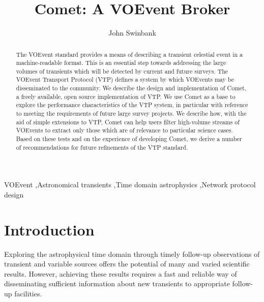 \documentclass[5p,authoryear]{elsarticle}
\begin{document}
\begin{frontmatter}

\title{Comet: A VOEvent Broker}

\author{John Swinbank}

\address{Astronomical Institute ``Anton Pannekoek'', University of Amsterdam, Postbus 94249, 1090 GE Amsterdam, The Netherlands}

\begin{abstract}

The VOEvent standard provides a means of describing a transient celestial
event in a machine-readable format. This is an essential step towards
addressing the large volumes of transients which will be detected by current
and future surveys. The VOEvent Transport Protocol (VTP) defines a system by
which VOEvents may be disseminated to the community. We describe the design
and implementation of Comet, a freely available, open source implementation of
VTP. We use Comet as a base to explore the performance characteristics of the
VTP system, in particular with reference to meeting the requirements of future
large survey projects. We describe how, with the aid of simple extensions to
VTP, Comet can help users filter high-volume streams of VOEvents to extract
only those which are of relevance to particular science cases.  Based on these
tests and on the experience of developing Comet, we derive a number of
recommendations for future refinements of the VTP standard.

\end{abstract}

\begin{keyword}
VOEvent \sep Astronomical transients \sep Time domain astrophysics \sep Network protocol design
\end{keyword}

\end{frontmatter}

\section{Introduction}
\label{sec:intro}

Exploring the astrophysical time domain through timely follow-up observations
of transient and variable sources offers the potential of many and varied
scientific results. However, achieving these results requires a fast and
reliable way of disseminating sufficient information about new transients to
appropriate follow-up facilities.
\end{document}
